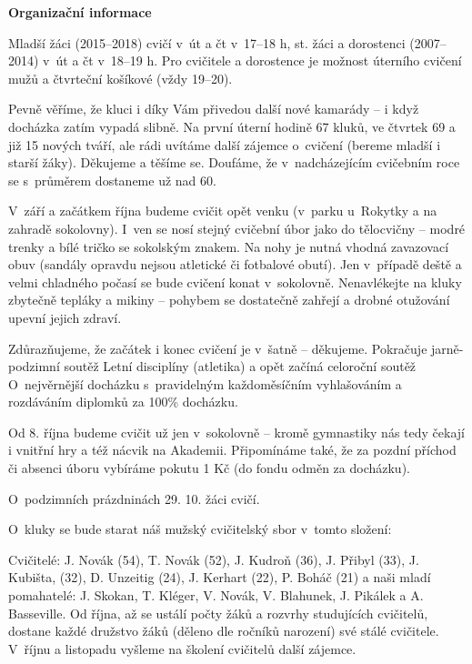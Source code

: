 \documentclass[11pt]{article}
\begin{document}
\begin{center}
  \noindent\textbf{Organizační informace}
\end{center}
\vspace*{6pt}
Mladší žáci (2015–2018) cvičí v~út a čt v~17–18 h, st. žáci a dorostenci (2007–2014) v~út a čt v~18–19 h. Pro cvičitele a dorostence je možnost úterního cvičení mužů a čtvrteční košíkové (vždy 19–20).

Pevně věříme, že kluci i díky Vám přivedou další nové kamarády – i když docházka zatím vypadá slibně. Na první úterní hodině 67 kluků, ve čtvrtek 69 a již 15 nových tváří, ale rádi uvítáme další zájemce o~cvičení (bereme mladší i starší žáky). Děkujeme a těšíme se. Doufáme, že v~nadcházejícím cvičebním roce se s~průměrem dostaneme už nad 60.

V~září a začátkem října budeme cvičit opět venku (v~parku u~Rokytky a na zahradě sokolovny). I~ven se nosí stejný cvičební úbor jako do tělocvičny – modré trenky a bílé tričko se sokolským znakem. Na nohy je nutná vhodná zavazovací obuv (sandály opravdu nejsou atletické či fotbalové obutí). Jen v~případě deště a velmi chladného počasí se bude cvičení konat v~sokolovně. Nenavlékejte na kluky zbytečně tepláky a mikiny – pohybem se dostatečně zahřejí a drobné otužování upevní jejich zdraví. 

Zdůrazňujeme, že začátek i konec cvičení je v~šatně – děkujeme. Pokračuje jarně-podzimní soutěž Letní disciplíny (atletika) a opět začíná celoroční soutěž O~nejvěrnější docházku s~pravidelným každoměsíčním vyhlašováním a rozdáváním diplomků za 100\% docházku. 

Od 8. října budeme cvičit už jen v~sokolovně – kromě gymnastiky nás tedy čekají i vnitřní hry a též nácvik na Akademii. Připomínáme také, že za pozdní příchod či absenci úboru vybíráme pokutu 1 Kč (do fondu odměn za docházku). 

O~podzimních prázdninách 29. 10. žáci cvičí.

O~kluky se bude starat náš mužský cvičitelský sbor v~tomto složení:

Cvičitelé: J. Novák (54), T. Novák (52), J. Kudroň (36), J. Přibyl (33), J. Kubišta, (32), D. Unzeitig (24), J. Kerhart (22), P. Boháč (21) a naši mladí pomahatelé: J. Skokan, T. Kléger, V. Novák, V. Blahunek, J. Pikálek a A. Basseville. Od října, až se ustálí počty žáků a rozvrhy studujících cvičitelů, dostane každé družstvo žáků (děleno dle ročníků narození) své stálé cvičitele. V~říjnu a listopadu vyšleme na školení cvičitelů další zájemce.
\end{document}
